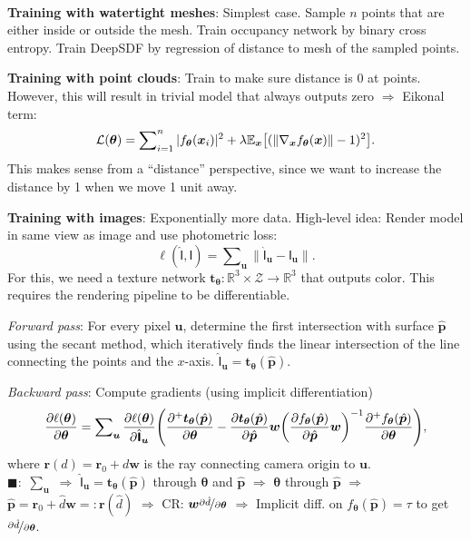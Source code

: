 \documentclass{article}
\newcommand{\lft}{\mathopen{}\mathclose\bgroup\left}
\newcommand{\rgt}{\aftergroup\egroup\right}
\newcommand{\E}{\mathbb{E}}
\newcommand{\R}{\mathbb{R}}
\renewcommand{\vec}[1]{\bm{#1}}
\newcommand{\tens}[1]{\bm{\mathsf{#1}}}
\newenvironment{topic}[1]
{\textbf{\sffamily \colorbox{black}{\rlap{\textbf{\textcolor{white}{#1}}}\hspace{\linewidth}\hspace{-2\fboxsep}}} \\ \vspace{0.2cm}}
{}
\begin{document}
\begin{multicols*}{2}
\begin{topic}{Implicit surfaces and neural radiance fields}
        \textbf{Training with watertight meshes}: Simplest case. Sample $n$ points that are either
        inside or outside the mesh. Train occupancy network by binary cross entropy. Train DeepSDF by
        regression of distance to mesh of the sampled points.

        \textbf{Training with point clouds}: Train to make sure distance is 0 at points. However, this will result in trivial model that always outputs zero $\Rightarrow$ Eikonal term: \[
            \mathcal{L}(\vec{\theta}) = \sum\nolimits_{i=1}^{n} |f_{\vec{\theta}}(\vec{x}_i)|^2  + \lambda \E_{\vec{x}} \lft[ (\| \nabla_{\vec{x}} f_{\vec{\theta}}(\vec{x}) \| - 1)^2 \rgt].
        \]
        This makes sense from a ``distance'' perspective, since we want to increase the distance by 1 when
        we move 1 unit away.

        \textbf{Training with images}: Exponentially more data. High-level idea: Render model in same
        view as image and use photometric loss: \[
            \ell(\hat{\tens{I}}, \tens{I}) = \sum\nolimits_{\vec{u}} \| \hat{\tens{I}}_{\vec{u}} - \tens{I}_{\vec{u}} \| .
        \]
        For this, we need a texture network $\vec{t}_{\vec{\theta}}: \R^3 \times \mathcal{Z} \to \R^3$ that
        outputs color. This requires the rendering pipeline to be differentiable.

        \textit{Forward pass}: For every pixel $\vec{u}$, determine the first intersection with surface
        $\hat{\vec{p}}$ using the secant method, which iteratively finds the linear intersection of the
        line connecting the points and the $x$-axis. $\hat{\tens{I}}_{\vec{u}} =
            \vec{t}_{\vec{\theta}}(\hat{\vec{p}})$.

        \textit{Backward pass}: Compute gradients (using implicit differentiation) \[
            \pdv{\ell(\vec{\theta})}{\vec{\theta}} = \sum\nolimits_{\vec{u}} \pdv{\ell(\vec{\theta})}{\hat{\tens{I}}_{\vec{u}}} \lft( \pdv{^+ \vec{t}_{\vec{\theta}}(\hat{\vec{p}})}{\vec{\theta}} - \pdv{\vec{t}_{\vec{\theta}}(\hat{\vec{p}})}{\hat{\vec{p}}} \vec{w} \lft( \pdv{f_{\vec{\theta}}(\hat{\vec{p}})}{\hat{\vec{p}}} \vec{w} \rgt)^{-1} \pdv{^+ f_{\vec{\theta}}(\hat{\vec{p}})}{\vec{\theta}} \rgt),
        \]
        where $\vec{r}(d) = \vec{r}_0 + d \vec{w}$ is the ray connecting camera origin to $\vec{u}$.\\
        $\blacksquare:$ $\sum_{\vec{u}}$ $\Rightarrow$ $\hat{\tens{I}}_{\vec{u}} =
            \vec{t}_{\vec{\theta}}(\hat{\vec{p}})$ through $\vec{\theta}$ and $\hat{\vec{p}}$ $\Rightarrow$
        $\vec{\theta}$ through $\hat{\vec{p}}$ $\Rightarrow$ $\hat{\vec{p}} = \vec{r}_0 + \hat{d}\vec{w} =:
            \vec{r}(\hat{d})$ $\Rightarrow$ CR: $\vec{w} \nicefrac{\partial \hat{d}}{\partial \vec{\theta}}$
        $\Rightarrow$ Implicit diff. on $f_{\vec{\theta}}(\hat{\vec{p}}) = \tau$ to get $\nicefrac{\partial
                \hat{d}}{\partial \vec{\theta}}$.


\end{topic}
\end{multicols*}
\end{document}
